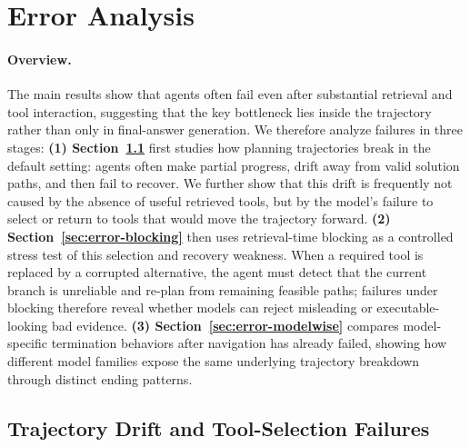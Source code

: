\section{Error Analysis}
\label{sec:error-analysis}




\paragraph{Overview.}
The main results show that agents often fail even after substantial retrieval and tool interaction, suggesting that the key bottleneck lies inside the trajectory rather than only in final-answer generation.
We therefore analyze failures in three stages:
\textbf{(1) Section~\ref{sec:error-planning-failures}} first studies how planning trajectories break in the default setting: agents often make partial progress, drift away from valid solution paths, and then fail to recover.
We further show that this drift is frequently not caused by the absence of useful retrieved tools, but by the model's failure to select or return to tools that would move the trajectory forward.
\textbf{(2) Section~\ref{sec:error-blocking}} then uses retrieval-time blocking as a controlled stress test of this selection and recovery weakness.
When a required tool is replaced by a corrupted alternative, the agent must detect that the current branch is unreliable and re-plan from remaining feasible paths; failures under blocking therefore reveal whether models can reject misleading or executable-looking bad evidence.
\textbf{(3) Section~\ref{sec:error-modelwise}} compares model-specific termination behaviors after navigation has already failed, showing how different model families expose the same underlying trajectory breakdown through distinct ending patterns. 


\subsection{Trajectory Drift and Tool-Selection Failures}
\label{sec:error-planning-failures}

